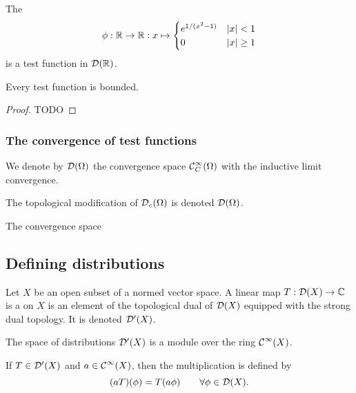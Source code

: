 \begin{example}
The 
\[ \phi: \mathbb{R}\to\mathbb{R}: x\mapsto \begin{cases}
e^{1/(x^2-1)} & |x|<1 \\ 0 & |x| \geq 1
\end{cases} \]
is a test function in $\operatorname{\mathcal{D}}(\mathbb{R})$.
\end{example}

\begin{lemma}
Every test function is bounded.
\end{lemma}
\begin{proof}
TODO
\end{proof}

\subsubsection{The convergence of test functions}

\begin{definition}
We denote by $\operatorname{\mathcal{D}}(\Omega)$ the convergence space $\operatorname{\mathcal{C}}^\infty_C(\Omega)$ with the inductive limit convergence.

The topological modification of $\operatorname{\mathcal{D}}_c(\Omega)$ is denoted $\operatorname{\mathcal{D}}(\Omega)$.
\end{definition}

\begin{lemma}
The convergence space
\end{lemma}



\subsection{Defining distributions}
\begin{definition}
    Let $X$ be an open subset of a normed vector space.
    A linear map $T: \operatorname{\mathcal{D}}(X) \to \mathbb{C}$ is a  on $X$ is an element of the topological dual of $\operatorname{\mathcal{D}}(X)$ equipped with the strong dual topology. It is denoted $\operatorname{\mathcal{D}^\prime}(X)$.
\end{definition}

\begin{proposition}
    The space of distributions $\operatorname{\mathcal{D}^\prime}(X)$ is a module over the ring $\operatorname{\mathcal{C}}^\infty(X)$.
    
    If $T\in \operatorname{\mathcal{D}^\prime}(X)$ and $a\in \operatorname{\mathcal{C}}^\infty(X)$, then the multiplication is defined by
    \[ (aT)(\phi) = T(a\phi) \qquad \forall \phi \in \operatorname{\mathcal{D}}(X). \]
\end{proposition}

